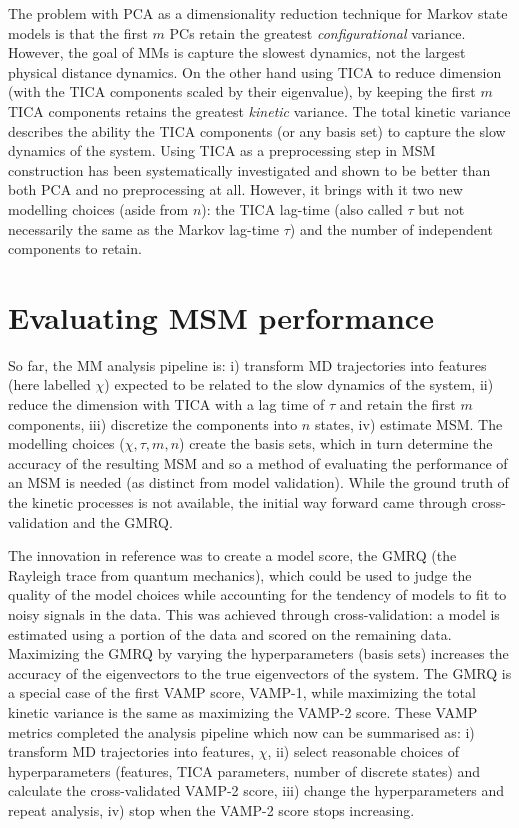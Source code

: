 The problem with PCA as a dimensionality reduction technique for Markov state models is that the first $m$ PCs retain the greatest \emph{configurational} variance\cite{friedman2001elements}. However, the goal of MMs is capture the slowest dynamics, not the largest physical distance dynamics. On the other hand using TICA to reduce dimension (with the TICA components scaled by their eigenvalue), by keeping the first $m$ TICA components retains the greatest \emph{kinetic} variance\cite{noeKineticDistanceKinetic2015}. The total kinetic variance describes the ability  the TICA components (or any basis set) to capture the slow dynamics of the system. Using TICA as a preprocessing step in MSM construction has been systematically investigated and shown to be better than both PCA and no preprocessing at all\cite{husicOptimizedParameterSelection2016}. However, it brings with it two new modelling choices (aside from $n$): the TICA lag-time (also called $\tau$ but not necessarily the same as the Markov lag-time $\tau$) and the number of independent components to retain.  

\section{Evaluating MSM performance}\label{sec:intro_msm_perf}
So far, the MM analysis pipeline is: i) transform MD trajectories into features (here labelled $\chi$) expected to be related to the slow dynamics of the system, ii) reduce the dimension with TICA with a lag time of $\tau$ and retain the first $m$ components, iii) discretize the components into $n$ states, iv) estimate MSM. The modelling choices ($\chi, \tau, m, n$) create the basis sets, which in turn determine the accuracy of the resulting MSM and so a method of evaluating the performance of an MSM is needed (as distinct from model validation). While the ground truth of the kinetic processes is not available, the initial way forward came through cross-validation and the GMRQ\cite{mcgibbonVariationalCrossvalidationSlow2015}. 

The innovation in reference \cite{mcgibbonVariationalCrossvalidationSlow2015} was to create a model score, the GMRQ (the Rayleigh trace from quantum mechanics), which could be used to judge the quality of the model choices while accounting for the tendency of models to fit to noisy signals in the data. This was achieved through cross-validation\cite{arlotSurveyCrossvalidationProcedures2009}: a model is estimated using a portion of the data and scored on the remaining data. Maximizing the GMRQ by varying the hyperparameters (basis sets) increases the accuracy of the eigenvectors to the true eigenvectors of the system. The GMRQ is a special case of the first VAMP score, VAMP-1, while maximizing the total kinetic variance is the same as maximizing the VAMP-2 score. These VAMP metrics completed the analysis pipeline\cite{schererVariationalSelectionFeatures2019} which now can be summarised as: i) transform MD trajectories into features, $\chi$, ii) select reasonable choices of  hyperparameters (features, TICA parameters, number of discrete states) and calculate the cross-validated VAMP-2 score, iii) change the hyperparameters and repeat analysis, iv) stop when the VAMP-2 score stops increasing. 

